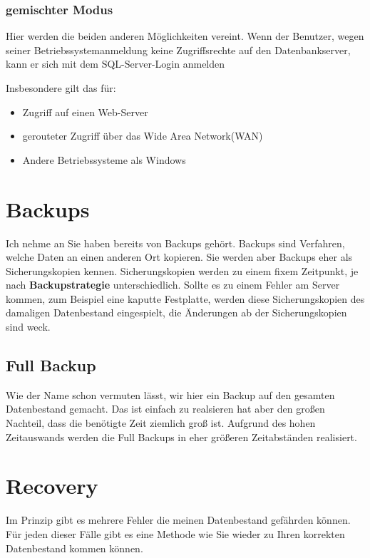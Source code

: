 \begin{flushleft}
\subsubsection{gemischter Modus}

Hier werden die beiden anderen Möglichkeiten vereint. Wenn der Benutzer, wegen seiner Betriebssystemanmeldung keine Zugriffsrechte auf den Datenbankserver, kann er sich mit dem SQL-Server-Login anmelden

Insbesondere gilt das für:
\begin{itemize}
\item Zugriff auf einen Web-Server
\item gerouteter Zugriff über das Wide Area Network(WAN)
\item Andere Betriebssysteme als Windows
\end{itemize}




\section{Backups}

Ich nehme an Sie haben bereits von Backups gehört. Backups sind Verfahren, welche Daten an einen anderen Ort kopieren. Sie werden aber Backups eher als Sicherungskopien kennen. Sicherungskopien werden zu einem fixem Zeitpunkt, je nach \textbf{Backupstrategie} unterschiedlich. Sollte es zu einem Fehler am Server kommen, zum Beispiel eine kaputte Festplatte, werden diese Sicherungskopien des damaligen Datenbestand eingespielt, die Änderungen ab der Sicherungskopien sind weck. 

\subsection{Full Backup}

Wie der Name schon vermuten lässt, wir hier ein Backup auf den gesamten Datenbestand gemacht. Das ist einfach zu realsieren hat aber den großen Nachteil, dass die benötigte Zeit ziemlich groß ist. Aufgrund des hohen Zeitauswands werden die Full Backups in eher größeren Zeitabständen realisiert.

\section{Recovery}

Im Prinzip gibt es mehrere Fehler die meinen Datenbestand gefährden können. Für jeden dieser Fälle gibt es eine Methode wie Sie wieder zu Ihren korrekten Datenbestand kommen können.



\end{flushleft}
